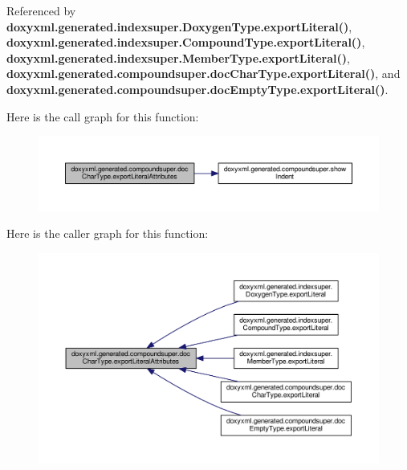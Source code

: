 Referenced by {\bf doxyxml.\+generated.\+indexsuper.\+Doxygen\+Type.\+export\+Literal()}, {\bf doxyxml.\+generated.\+indexsuper.\+Compound\+Type.\+export\+Literal()}, {\bf doxyxml.\+generated.\+indexsuper.\+Member\+Type.\+export\+Literal()}, {\bf doxyxml.\+generated.\+compoundsuper.\+doc\+Char\+Type.\+export\+Literal()}, and {\bf doxyxml.\+generated.\+compoundsuper.\+doc\+Empty\+Type.\+export\+Literal()}.



Here is the call graph for this function\+:
\nopagebreak
\begin{figure}[H]
\begin{center}
\leavevmode
\includegraphics[width=350pt]{d3/dba/classdoxyxml_1_1generated_1_1compoundsuper_1_1docCharType_a59c0c917a02f1c12cfd42d5c71f2eaa7_cgraph}
\end{center}
\end{figure}




Here is the caller graph for this function\+:
\nopagebreak
\begin{figure}[H]
\begin{center}
\leavevmode
\includegraphics[width=350pt]{d3/dba/classdoxyxml_1_1generated_1_1compoundsuper_1_1docCharType_a59c0c917a02f1c12cfd42d5c71f2eaa7_icgraph}
\end{center}
\end{figure}


